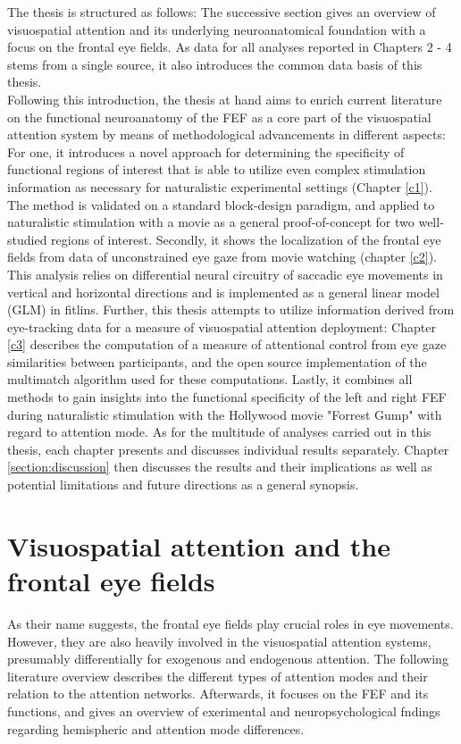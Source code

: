 \documentclass[a4paper, 12pt]{scrreprt}
\begin{document}
The thesis is structured as follows: The successive section gives an overview of visuospatial attention and its underlying neuroanatomical foundation with a focus on the frontal eye fields. As data for all analyses reported in Chapters 2 - 4 stems from a single source, it also introduces the common data basis of this thesis. \\
Following this introduction, the thesis at hand aims to enrich current literature on the functional neuroanatomy of the FEF as a core part of the visuospatial attention system by means of methodological advancements in different aspects: For one, it introduces a novel approach for determining the specificity of functional regions of interest that is able to utilize even complex stimulation information as necessary for naturalistic experimental settings (Chapter \ref{c1}). The method is validated on a standard block-design paradigm, and applied to naturalistic stimulation with a movie as a general proof-of-concept for two well-studied regions of interest.
Secondly, it shows  the localization of the frontal eye fields from data of unconstrained eye gaze from movie watching (chapter \ref{c2}). This analysis relies on differential neural circuitry of saccadic eye movements in vertical and horizontal directions and is implemented as a general linear model (GLM) in fitlins. Further, this thesis attempts to utilize information derived from eye-tracking data for a measure of visuospatial attention deployment: Chapter \ref{c3} describes the computation of a measure of attentional control from eye gaze similarities between participants, and the open source implementation of the multimatch algorithm used for these computations. Lastly, it combines all methods to gain insights into the functional specificity of the left and right FEF during naturalistic stimulation with the Hollywood movie "Forrest Gump" with regard to attention mode. As for the multitude of analyses carried out in this thesis, each chapter presents and discusses individual results separately. Chapter \ref{section:discussion} then discusses the results and their implications as well as potential limitations and future directions as a general synopsis. \newline


\section{Visuospatial attention and the frontal eye fields}
As their name suggests, the frontal eye fields play crucial roles in eye movements. However, they are also heavily involved in the visuospatial attention systems, presumably differentially for exogenous and endogenous attention. The following literature overview describes the different types of attention modes and their relation to the attention networks. Afterwards, it focuses on the FEF and its functions, and gives an overview of exerimental and neuropsychological fndings regarding hemispheric and attention mode differences. 
\end{document}
